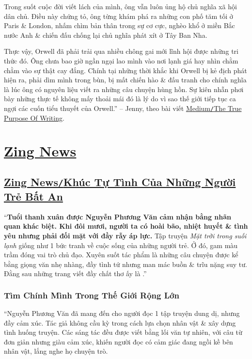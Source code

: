 \documentclass[oneside]{book}
\numberwithin{equation}{section}
\begin{document}
Trong suốt cuộc đời viết lách của mình, ông vẫn luôn ủng hộ chủ nghĩa xã hội dân chủ. Điều này chứng tỏ, ông từng khám phá ra những con phố tăm tối ở Paris \& London, nhấm chìm bản thân trong sự cơ cực, nghèo khổ ở miền Bắc nước Anh \& chiến đấu chống lại chủ nghĩa phát xít ở Tây Ban Nha.

Thực vậy, Orwell đã phải trải qua nhiều chông gai mới lĩnh hội được những tri thức đó. Ông chưa bao giờ ngần ngại lao mình vào nơi lạnh giá hay nhìn chằm chằm vào sự thật cay đắng. Chính tại những thời khắc khi Orwell bị kẻ địch phát hiện ra, phải dìm mình trong bùn, bị mất chiến hào \& đấu tranh cho chính nghĩa là lúc ông có nguyên liệu viết ra những câu chuyện hùng hồn. Sự kiên nhẫn phơi bày những thực tế không mấy thoải mái đó là lý do vì sao thế giới tiếp tục ca ngợi các cuốn tiểu thuyết của Orwell.'' -- Jenny, theo bài viết \href{https://medium.com/personal-growth/george-orwell-why-your-writing-must-have-purpose-77a3e94d6692}{Medium\texttt{/}The True Purpose Of Writing}.


\chapter{\href{https://zingnews.vn}{Zing News}}

\section{\href{https://zingnews.vn/khuc-tu-tinh-cua-nhung-nguoi-tre-bat-an-post1322529.html}{Zing News\texttt{/}Khúc Tự Tình Của Những Người Trẻ Bất An}}
``\textbf{Tuổi thanh xuân được Nguyễn Phương Văn cảm nhận bằng nhãn quan khác biệt. Khi đôi mươi, người ta có hoài bão, nhiệt huyết \& tình yêu nhưng phải đối mặt với đầy rẫy áp lực.} Tập truyện \textit{Mặt trời trong suối lạnh} giống như 1 bức tranh về cuộc sống của những người trẻ. Ở đó, gam màu trầm đóng vai trò chủ đạo. Xuyên suốt tác phẩm là những câu chuyện được kể bằng giọng văn nhẹ nhàng, đầy tình tứ nhưng man mác buồn \& trĩu nặng suy tư. Đằng sau những trang viết đầy chất thơ ấy là .''

\subsection{Tìm Chính Mình Trong Thế Giới Rộng Lớn}
``Nguyễn Phương Văn đã mang đến cho người đọc 1 tập truyện dung dị, nhưng đầy cảm xúc. Tác giả không cầu kỳ trong cách lựa chọn nhân vật \& xây dựng tình huống truyện. Các sáng tác đều được viết bằng lối văn tự nhiên, với câu từ đơn giản nhưng giàu cảm xúc, khiến người đọc có cảm giác đang ngồi kề bên nhân vật, lắng nghe họ chuyện trò.
\end{document}
